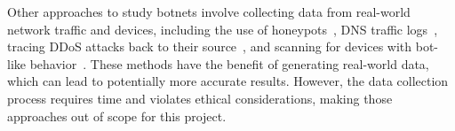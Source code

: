 Other approaches to study botnets involve collecting data from real-world network traffic and devices, including the use of honeypots~\cite{Antonakakis2017_USENIX_Mirai_First_Study, silva2013_Botnet_Survey}, DNS traffic logs~\cite{Antonakakis2017_USENIX_Mirai_First_Study, feily2009botnet_detection}, tracing DDoS attacks back to their source~\cite{Antonakakis2017_USENIX_Mirai_First_Study}, and scanning for devices with bot-like behavior~\cite{Antonakakis2017_USENIX_Mirai_First_Study, feily2009botnet_detection, herwig2019hajime, acarali2016http_botnets}. These methods have the benefit of generating real-world data, which can lead to potentially more accurate results. However, the data collection process requires time and violates ethical considerations, making those approaches out of scope for this project.
